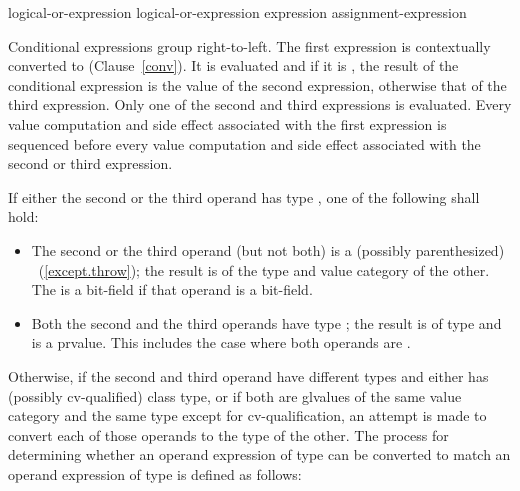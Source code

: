 \begin{bnf}
\br
    logical-or-expression\br
    logical-or-expression  expression \terminal{:} assignment-expression
\end{bnf}

\pnum
Conditional expressions group right-to-left. The first expression is
contextually converted to 
(Clause~\ref{conv}). It is
evaluated and if it is , the result of the conditional
expression is the value of the second expression, otherwise that of the
third expression. Only one of the second and third expressions is
evaluated. Every
%
value computation and side effect associated with the
first expression is sequenced before every value computation and side
effect associated with the second or third expression.

\pnum
If either the second or the third operand has type ,
one of the following shall hold:

\begin{itemize}
%
\item The second or the third operand (but not both) is a (possibly
parenthesized) ~(\ref{except.throw}); the result
is of the type and value category of the other.
The 
is a bit-field if that operand is a bit-field.

\item Both the second and the third operands have type ; the
result is of type  and is a prvalue. \enternote This
includes the case where both operands are .
\exitnote
\end{itemize}

\pnum
Otherwise, if the second and third operand have different types and
either has (possibly cv-qualified) class type, or if both
are glvalues of the same value category and the same type except for
cv-qualification, an attempt is made to
convert each of those operands to the type of the other. The process for
determining whether an operand expression  of type 
can be converted to match an operand expression  of type
 is defined as follows:


